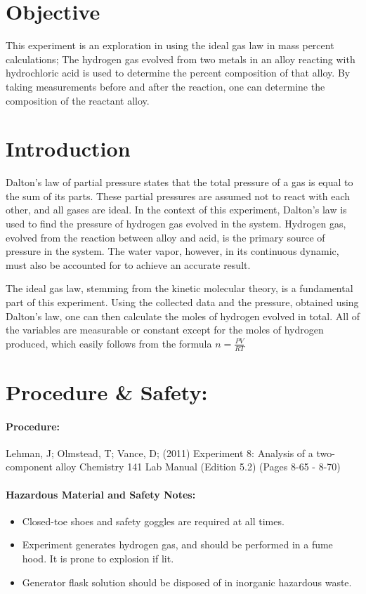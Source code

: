 \documentclass[11pt,letterpaper]{report}
\begin{document}

\pagebreak

\section*{Objective}
This experiment is an exploration in using the ideal gas law in mass percent calculations; The hydrogen gas evolved from two metals in an alloy reacting with hydrochloric acid is used to determine the percent composition of that alloy. By taking measurements before and after the reaction, one can determine the composition of the reactant alloy.

\section*{Introduction}

Dalton's law of partial pressure states that the total pressure of a gas is equal to the sum of its parts. These partial pressures are assumed not to react with each other, and all gases are ideal. In the context of this experiment, Dalton's law is used to find the pressure of hydrogen gas evolved in the system. Hydrogen gas, evolved from the reaction between alloy and acid, is the primary source of pressure in the system. The water vapor, however, in its continuous dynamic, must also be accounted for to achieve an accurate result. 

The ideal gas law, stemming from the kinetic molecular theory, is a fundamental part of this experiment. Using the collected data and the pressure, obtained using Dalton's law, one can then calculate the moles of hydrogen evolved in total. All of the variables are measurable or constant except for the moles of hydrogen produced, which easily follows from the formula $n = \frac{PV}{RT}$

\section*{Procedure \& Safety:}

\paragraph{Procedure:}
Lehman, J; Olmstead, T; Vance, D; (2011)
Experiment 8: Analysis of a two-component alloy
Chemistry 141 Lab Manual (Edition 5.2) (Pages 8-65 - 8-70)

\paragraph{Hazardous Material and Safety Notes:}
\begin{itemize}
\item Closed-toe shoes and safety goggles are required at all times. \\[-0.5cm]
\item Experiment generates hydrogen gas, and should be performed in a fume hood. It is prone to explosion if lit. \\[-0.5cm]
\item Generator flask solution should be disposed of in inorganic hazardous waste. \\[-0.5cm]
\end{itemize}
\end{document}
